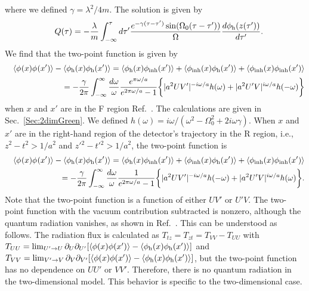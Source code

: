 \documentclass[aps,prd,preprintnumbers,nofootinbib,showpacs]{revtex4}%
\begin{document}
\begin{widetext}
where we defined $\gamma={\lambda^2/ 4m}$.
The solution is given by 
\begin{eqnarray}
&&Q(\tau)={-}{\lambda\over m}\int_{-\infty}^\tau d\tau' {e^{-\gamma(\tau-\tau')}\sin(\Omega_0(\tau-\tau'))\over \Omega}
{d\phi_{\rm h}(z(\tau'))\over d\tau'}. 
\end{eqnarray}
We find that the two-point function is given by 
\begin{eqnarray}
&&\langle\phi_{\rm }(x)\phi_{\rm }(x')\rangle-\langle\phi_{\rm h}(x)\phi_{\rm h}(x')\rangle
=
\langle\phi_{\rm h}(x)\phi_{\rm inh}(x')\rangle
+\langle\phi_{\rm inh}(x)\phi_{\rm h}(x')\rangle
+\langle\phi_{\rm inh}(x)\phi_{\rm inh}(x')\rangle
\nonumber\\
&&~~~~~~~~~~~~~~
=-{\gamma\over 2\pi}\int_{-\infty}^{\infty}{d\omega\over \omega}{e^{\pi\omega/a}\over e^{2\pi\omega/a}-1}
\biggl\{|a^2 UV'|^{-i\omega/a}h(\omega)+|a^2 U'V|^{i\omega/a}h(-\omega)
\biggr\}
\label{tdfinal}
\end{eqnarray}
when $x$ and $x'$ are in the F region Ref.~\cite{HuRaval}. 
The calculations are given in Sec.~\ref{Sec:2dimGreen}.
We defined $h(\omega)=i\omega/(\omega^2-\Omega_0^2+2i\omega\gamma)$. 
When $x$ and $x'$ are in the right-hand region of the detector's trajectory in 
the R region, i.e., $z^2-t^2>1/a^2$ and $z'{}^2-t'{}^2>1/a^2$, the two-point function is
\begin{eqnarray}
&&\langle\phi_{\rm }(x)\phi_{\rm }(x')\rangle-\langle\phi_{\rm h}(x)\phi_{\rm h}(x')\rangle
=
\langle\phi_{\rm h}(x)\phi_{\rm inh}(x')\rangle
+\langle\phi_{\rm inh}(x)\phi_{\rm h}(x')\rangle
+\langle\phi_{\rm inh}(x)\phi_{\rm inh}(x')\rangle
\nonumber\\
&&~~~~~~~~~~~~~~
=-{\gamma\over 2\pi}\int_{-\infty}^{\infty}{d\omega\over \omega}{1\over e^{2\pi\omega/a}-1}
\biggl\{|a^2 UV'|^{-i\omega/a}h(-\omega)+|a^2 U'V|^{i\omega/a}h(\omega)
\biggr\}.
\label{tdfinalR}
\end{eqnarray}
Note that the two-point function is a function of either $UV'$ or $U'V$.
The two-point function with the vacuum contribution subtracted is nonzero,
although
the quantum radiation vanishes, as shown in Ref.~\cite{HuRaval}.
This can be understood as follows. 
The radiation flux is calculated as
$T_{tz}=T_{zt}=T_{VV}-T_{UU}$ with $T_{UU}=\lim_{U'\rightarrow U} 
\partial_U\partial_{U'}
[\langle \phi(x)\phi(x')\rangle-\langle\phi_{\rm h}(x)\phi_{\rm h}(x')\rangle]$ 
and $T_{VV}=\lim_{V'\rightarrow V} 
\partial_V\partial_{V'}
[\langle \phi(x)\phi(x')\rangle-\langle\phi_{\rm h}(x)\phi_{\rm h}(x')\rangle]$,
but the two-point function has no dependence on $UU'$ or $VV'$. 
Therefore, there is no quantum radiation in the two-dimensional model.
This behavior is specific to the two-dimensional case. 


\end{widetext}
\end{document}
